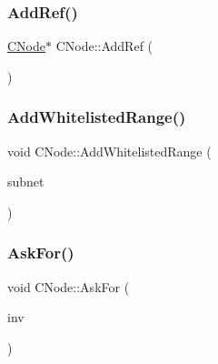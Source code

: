 \mbox{\label{class_c_node_afb65ed679f7bda59aab89e0f5afae292}} 
\subsubsection{\texorpdfstring{Add\+Ref()}{AddRef()}}
{\footnotesize\ttfamily \mbox{\hyperlink{class_c_node}{C\+Node}}$\ast$ C\+Node\+::\+Add\+Ref (\begin{DoxyParamCaption}{ }\end{DoxyParamCaption})\hspace{0.3cm}{\ttfamily [inline]}}

\mbox{\label{class_c_node_ad2c1f955ec23851bd87a6bb144d85d03}} 
\subsubsection{\texorpdfstring{Add\+Whitelisted\+Range()}{AddWhitelistedRange()}}
{\footnotesize\ttfamily void C\+Node\+::\+Add\+Whitelisted\+Range (\begin{DoxyParamCaption}\item[{const \mbox{\hyperlink{class_c_sub_net}{C\+Sub\+Net}} \&}]{subnet }\end{DoxyParamCaption})\hspace{0.3cm}{\ttfamily [static]}}

\mbox{\label{class_c_node_ae0def1498409407d1612833a7d38c875}} 
\subsubsection{\texorpdfstring{Ask\+For()}{AskFor()}}
{\footnotesize\ttfamily void C\+Node\+::\+Ask\+For (\begin{DoxyParamCaption}\item[{const \mbox{\hyperlink{class_c_inv}{C\+Inv}} \&}]{inv }\end{DoxyParamCaption})}

\mbox{\label{class_c_node_a6afc79c9c4190f6c8eda1722e86c923d}} 
